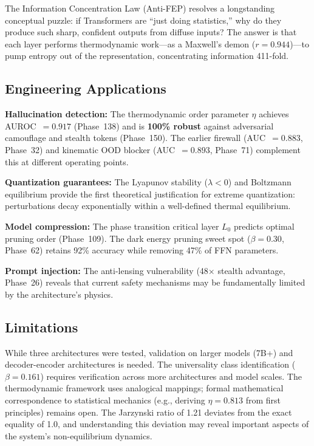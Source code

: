 \documentclass[11pt,a4paper]{article}
\begin{document}
The Information Concentration Law (Anti-FEP) resolves a longstanding conceptual puzzle: if Transformers are ``just doing statistics,'' why do they produce such sharp, confident outputs from diffuse inputs? The answer is that each layer performs thermodynamic work---as a Maxwell's demon ($r = 0.944$)---to pump entropy out of the representation, concentrating information 411-fold.

\subsection{Engineering Applications}

\textbf{Hallucination detection:} The thermodynamic order parameter $\eta$ achieves AUROC~$= 0.917$ (Phase~138) and is \textbf{100\% robust} against adversarial camouflage and stealth tokens (Phase~150). The earlier firewall (AUC~$= 0.883$, Phase~32) and kinematic OOD blocker (AUC~$= 0.893$, Phase~71) complement this at different operating points.

\textbf{Quantization guarantees:} The Lyapunov stability ($\lambda < 0$) and Boltzmann equilibrium provide the first theoretical justification for extreme quantization: perturbations decay exponentially within a well-defined thermal equilibrium.

\textbf{Model compression:} The phase transition critical layer $L_0$ predicts optimal pruning order (Phase~109). The dark energy pruning sweet spot ($\beta = 0.30$, Phase~62) retains 92\% accuracy while removing 47\% of FFN parameters.

\textbf{Prompt injection:} The anti-lensing vulnerability (48$\times$ stealth advantage, Phase~26) reveals that current safety mechanisms may be fundamentally limited by the architecture's physics.

\subsection{Limitations}

While three architectures were tested, validation on larger models (7B+) and decoder-encoder architectures is needed. The universality class identification ($\beta = 0.161$) requires verification across more architectures and model scales. The thermodynamic framework uses analogical mappings; formal mathematical correspondence to statistical mechanics (e.g., deriving $\eta = 0.813$ from first principles) remains open. The Jarzynski ratio of 1.21 deviates from the exact equality of 1.0, and understanding this deviation may reveal important aspects of the system's non-equilibrium dynamics.
\end{document}
